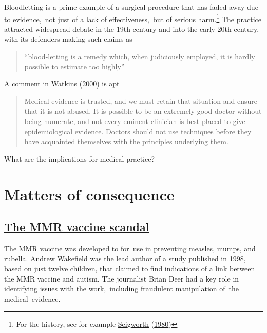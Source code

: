 \documentclass[
  10pt,
  b5paper]{book}
\begin{document}
Bloodletting is a prime example of a surgical procedure that
has faded away due to evidence,~not just of a lack of
effectiveness,~but of serious harm.\footnote{For the history, see for
  example \protect\hyperlink{ref-seigworth1980bloodletting}{Seigworth} (\protect\hyperlink{ref-seigworth1980bloodletting}{1980})} The practice attracted
widespread debate in the 19th century and into the early 20th
century, with its defenders making such claims as

\begin{quote}
``blood-letting is a remedy which, when judiciously employed,
it is hardly possible to estimate too highly''
\end{quote}

A comment in \protect\hyperlink{ref-watkins2000conviction}{Watkins} (\protect\hyperlink{ref-watkins2000conviction}{2000}) is apt

\begin{quote}
Medical evidence is trusted, and we must retain that situation and ensure that it is not abused. It is possible to be an extremely good doctor without being numerate, and not every eminent clinician is best placed to give epidemiological evidence. Doctors should not use techniques before they have acquainted themselves with the principles underlying them.
\end{quote}

What are the implications for medical practice?

\hypertarget{matters-of-consequence}{%
\chapter{Matters of consequence}\label{matters-of-consequence}}

\hypertarget{the-mmr-vaccine-scandal}{%
\section{\texorpdfstring{\href{https://en.wikipedia.org/wiki/MMR_vaccine_controversy}{The MMR vaccine scandal}}{The MMR vaccine scandal}}\label{the-mmr-vaccine-scandal}}

The MMR vaccine was developed to for~use in preventing measles,
mumps, and rubella. Andrew Wakefield was the lead author of a
study published in 1998, based on just twelve children, that
claimed to find indications of a link between the MMR vaccine
and autism. The journalist Brian Deer had a key role in
identifying issues with the work,~including fraudulent
manipulation of~the medical~evidence.
\end{document}
